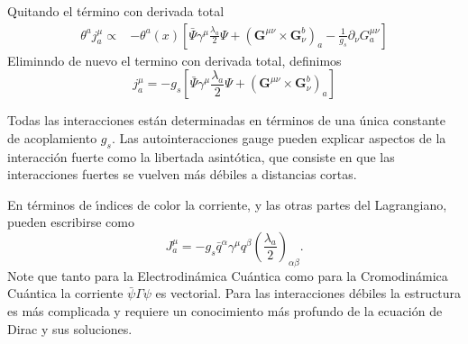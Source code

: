 Quitando el t\'ermino con derivada total
\begin{align}
\theta^aj^\mu_a \propto&-\theta^a(x)\left[\bar{\Psi}\gamma^\mu\frac{\lambda_a}{2}\Psi+\left(\mathbf{G}^{\mu\nu}\times\mathbf{G}_\nu^b\right)_a
-\frac{1}{g_s}\partial_\nu G^{\mu\nu}_a\right]
\end{align}
Eliminndo de nuevo el termino con derivada total, definimos
\begin{equation}
\label{eq:255}
j^\mu_a=-g_s\left[\bar{\Psi}\gamma^\mu\frac{\lambda_a}{2}\Psi+\left(\mathbf{G}^{\mu\nu}\times\mathbf{G}_\nu^b\right)_a\right]
\end{equation}


Todas las interacciones est\'an determinadas en t\'erminos de una \'unica constante de acoplamiento $g_s$. Las autointeracciones gauge pueden explicar aspectos de la interacci\'on fuerte como la libertada asint\'otica, que consiste en que las interacciones fuertes se vuelven m\'as d\'ebiles a distancias cortas. 

En t\'erminos de \'\i ndices de color la corriente, y las otras partes del Lagrangiano, pueden escribirse como
\begin{equation}
  \label{eq:223}
  J^\mu_a=-g_s\bar{q}^\alpha\gamma^\mu q^\beta\left(\frac{\lambda_a}{2}\right)_{\alpha\beta}.
\end{equation}
Note que tanto para la Electrodin\'amica Cu\'antica como para la Cromodin\'amica Cu\'antica la corriente $\bar{\psi}\Gamma\psi$ es vectorial. Para las interacciones d\'ebiles la estructura es m\'as complicada y requiere un conocimiento m\'as profundo de la ecuaci\'on de Dirac y sus soluciones.


